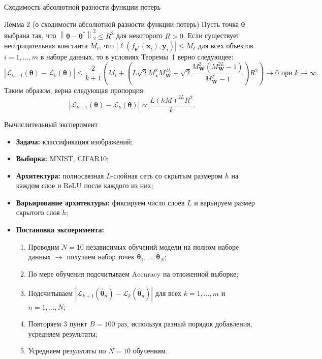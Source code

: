 \documentclass[aspectratio=169]{beamer}
\begin{document}
\begin{frame}{Сходимость абсолютной разности функции потерь}
    \fontsize{9pt}{10pt}\selectfont
    \vspace{1em}
    \begin{block}{Лемма 2 (о сходимости абсолютной разности функции потерь)}
        Пусть точка $\boldsymbol{\theta}$ выбрана так, что $\left\|\boldsymbol{\theta} - \boldsymbol{\theta}^*\right\|_2^2 \leqslant R^2$ для некоторого $R > 0$. Если существует неотрицательная константа $M_{\ell}$, что $\left| \ell(f_{\boldsymbol{\theta}^*}(\mathbf{x}_{i}), \mathbf{y}_{i}) \right| \leqslant M_{\ell}$ для всех объектов $i = 1, \ldots, m$ в наборе данных, то в условиях Теоремы~1 верно следующее:
        \[ \left| \mathcal{L}_{k+1}(\boldsymbol{\theta}) - \mathcal{L}_k(\boldsymbol{\theta}) \right| \leqslant \dfrac{2}{k+1}\left( M_{\ell} + \left( L \sqrt{2} M_{\mathbf{x}}^2 M_{\mathbf{W}}^{2L} + \sqrt{2} \dfrac{M_{\mathbf{W}}^2 (M_{\mathbf{W}}^{2L} - 1)}{M_{\mathbf{W}}^2 - 1} \right) R^2 \right) \to 0 \text{ при } k \to \infty. \]
        Таким образом, верна следующая пропорция:
        \begin{equation*}
            \left| \mathcal{L}_{k+1}(\boldsymbol{\theta}) - \mathcal{L}_k(\boldsymbol{\theta}) \right| \propto \dfrac{L (hM)^{2L} R^2}{k}. 
        \end{equation*}
    \end{block}
\end{frame}

\begin{frame}{Вычислительный эксперимент}
    \begin{itemize}
        \item \textbf{Задача:} классификация изображений;
        \item \textbf{Выборка:} MNIST, CIFAR10;
        \item \textbf{Архитектура:} полносвязная $L$-слойная сеть со скрытым размером $h$ на каждом слое и ReLU после каждого из них;
        \item \textbf{Варьирование архитектуры:} фиксируем число слоев $L$ и варьируем размер скрытого слоя $h$;
        \item \textbf{Постановка эксперимента:}
        \begin{enumerate}
            \item Проводим $N=10$ независимых обучений модели на полном наборе данных $\to$ получаем набор точек $\hat{\boldsymbol{\theta}}_1, \ldots, \hat{\boldsymbol{\theta}}_N$;
            \item По мере обучения подсчитываем Accuracy на отложенной выборке;
            \item Подсчитываем $\left| \mathcal{L}_{k+1}(\hat{\boldsymbol{\theta}}_{n}) - \mathcal{L}_k(\hat{\boldsymbol{\theta}}_{n}) \right|$ для всех $k = 1, \ldots, m$ и $n = 1, \ldots, N$;
            \item Повторяем 3 пункт $B=100$ раз, используя разный порядок добавления, усредняем результаты;
            \item Усредняем результаты по $N=10$ обучениям.
        \end{enumerate}
    \end{itemize}
\end{frame}
\end{document}
